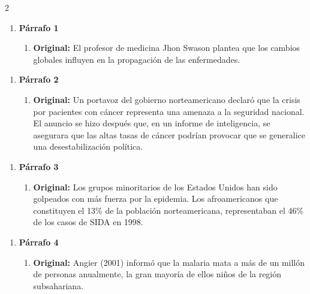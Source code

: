 \documentclass{article}
\begin{document}
\setlength{\columnsep}{2cm}
\begin{multicols}{2}
	
	\begin{enumerate}[label={{\textcolor{trueblue}{\textbf{Ej}. \arabic*.0}}}, start=1]
		\item \textbf{Párrafo 1}
		\begin{enumerate}
			\item \textbf{Original:} El profesor de medicina Jhon Swason plantea que los cambios globales influyen en la propagación de las enfermedades.
		\end{enumerate}
	\end{enumerate}
	
	\begin{enumerate}[label={{\textcolor{trueblue}{\textbf{Ej}. \arabic*.0}}}, start=2]
		\item \textbf{Párrafo 2}
		\begin{enumerate}
			\item \textbf{Original:} Un portavoz del gobierno norteamericano declaró que la crisis por
			pacientes con cáncer representa una amenaza a la seguridad nacional. El anuncio
			se hizo después que, en un informe de inteligencia, se asegurara que las altas tasas
			de cáncer podrían provocar que se generalice una desestabilización política.
		\end{enumerate}
	\end{enumerate}
	
	\begin{enumerate}[label={{\textcolor{trueblue}{\textbf{Ej}. \arabic*.0}}}, start=3]
		\item \textbf{Párrafo 3}
		\begin{enumerate}
			\item \textbf{Original:} Los grupos minoritarios de los Estados Unidos han sido golpeados con más fuerza por la epidemia. Los afroamericanos que constituyen el 13\% de la población norteamericana, representaban el 46\% de los casos de SIDA en 1998.
		\end{enumerate}
	\end{enumerate}
	
	\begin{enumerate}[label={{\textcolor{trueblue}{\textbf{Ej}. \arabic*.0}}}, start=4]
		\item \textbf{Párrafo 4}
		\begin{enumerate}
			\item \textbf{Original:} Angier (2001) informó que la malaria mata a más de un millón de personas anualmente, la gran mayoría de ellos niños de la región subsahariana.
		\end{enumerate}
	\end{enumerate}
	

\end{multicols}
\end{document}
